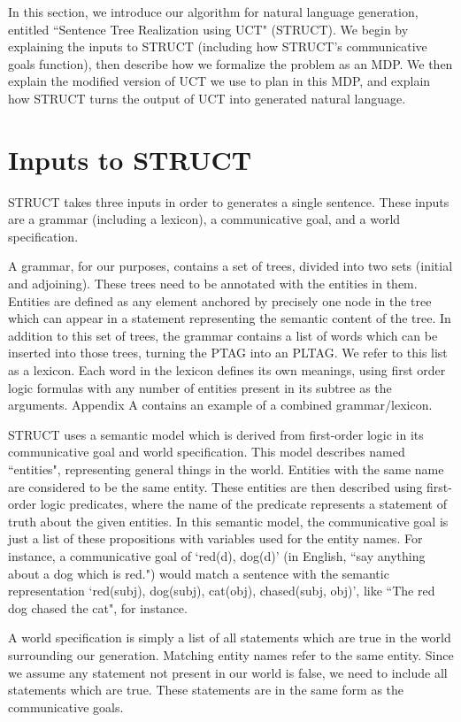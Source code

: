 In this section, we introduce our algorithm for natural language generation,
entitled ``Sentence Tree Realization using UCT" (STRUCT).  We begin
by explaining the inputs to STRUCT (including how STRUCT's communicative
goals function), then describe how we formalize the problem as an MDP.
We then explain the modified version of UCT we use to plan in this MDP, and explain
how STRUCT turns the output of UCT into generated natural language.

\section{Inputs to STRUCT}

STRUCT takes three inputs in order to generates a single sentence.
These inputs are a grammar (including a lexicon),
a communicative goal, and a world specification.

A grammar, for our purposes, contains a set of trees, divided into two sets (initial and adjoining).
These trees need to be annotated with the entities in them.  Entities are defined as any element
anchored by precisely one node in the tree which can appear in a statement representing the
semantic content of the tree.  In addition to this set of trees, the grammar contains a list of
words which can be inserted into those trees, turning the PTAG into an PLTAG.  We refer to this
list as a lexicon.  Each word in the lexicon defines its own meanings, using first order logic
formulas with any number of entities present in its subtree as the arguments.
Appendix A contains an example of a combined grammar/lexicon.

STRUCT uses a semantic model which is derived from first-order logic in its communicative
goal and world specification.  This model describes named ``entities", representing general
things in the world.  Entities with the same name are considered to be the same entity.
These entities are then described using first-order logic predicates, where the
name of the predicate represents a statement of truth about the given entities.  In this
semantic model, the communicative goal is just a list of these propositions with variables used
for the entity names.
For instance, a communicative goal of `red(d), dog(d)' (in English, ``say anything about a dog
which is red.") would match a sentence 
with the semantic representation `red(subj), dog(subj), cat(obj), chased(subj, obj)',
like ``The red dog chased the cat", for instance.

A world specification is simply a list of all statements which are true in the world surrounding our generation.
Matching entity names refer to the same entity.  Since we assume any statement not present
in our world is false, we need to include all statements which are true.  These statements are in
the same form as the communicative goals.

